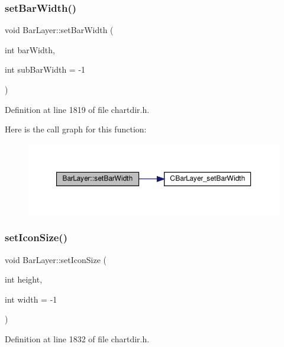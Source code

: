 \subsubsection{\texorpdfstring{set\+Bar\+Width()}{setBarWidth()}}
{\footnotesize\ttfamily void Bar\+Layer\+::set\+Bar\+Width (\begin{DoxyParamCaption}\item[{int}]{bar\+Width,  }\item[{int}]{sub\+Bar\+Width = {\ttfamily -\/1} }\end{DoxyParamCaption})\hspace{0.3cm}{\ttfamily [inline]}}



Definition at line 1819 of file chartdir.\+h.

Here is the call graph for this function\+:
\nopagebreak
\begin{figure}[H]
\begin{center}
\leavevmode
\includegraphics[width=350pt]{class_bar_layer_a3399504b16dbb8730329bd232c04cd9b_cgraph}
\end{center}
\end{figure}
\mbox{\label{class_bar_layer_ad61ea98d0fbe8a5e312af13dc5e0f837}} 
\subsubsection{\texorpdfstring{set\+Icon\+Size()}{setIconSize()}}
{\footnotesize\ttfamily void Bar\+Layer\+::set\+Icon\+Size (\begin{DoxyParamCaption}\item[{int}]{height,  }\item[{int}]{width = {\ttfamily -\/1} }\end{DoxyParamCaption})\hspace{0.3cm}{\ttfamily [inline]}}



Definition at line 1832 of file chartdir.\+h.

